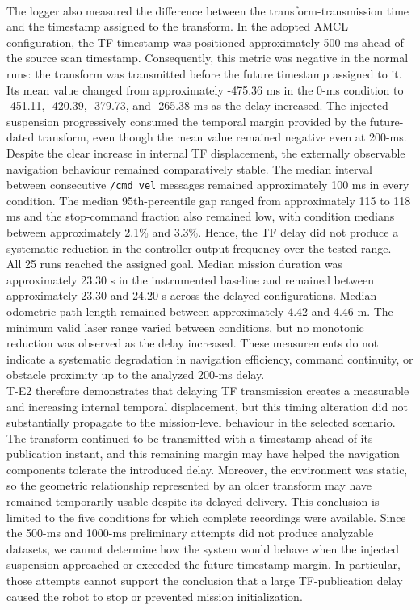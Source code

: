 \\
The logger also measured the difference between the transform-transmission time and the timestamp assigned to the transform. In the adopted AMCL configuration, the TF timestamp was positioned approximately 500 ms ahead of the source scan timestamp. Consequently, this metric was negative in the normal runs: the transform was transmitted before the future timestamp assigned to it. Its mean value changed from approximately -475.36 ms in the 0-ms condition to -451.11, -420.39, -379.73, and -265.38 ms as the delay increased. The injected suspension progressively consumed the temporal margin provided by the future-dated transform, even though the mean value remained negative even at 200-ms.
\\
Despite the clear increase in internal TF displacement, the externally observable navigation behaviour remained comparatively stable. The median interval between consecutive \texttt{/cmd\_vel} messages remained approximately 100 ms in every condition. The median 95th-percentile gap ranged from approximately 115 to 118 ms and the stop-command fraction also remained low, with condition medians between approximately 2.1\% and 3.3\%. Hence, the TF delay did not produce a systematic reduction in the controller-output frequency over the tested range.
\\
All 25 runs reached the assigned goal. Median mission duration was approximately 23.30 s in the instrumented baseline and remained between approximately 23.30 and 24.20 s across the delayed configurations. Median odometric path length remained between approximately 4.42 and 4.46 m. The minimum valid laser range varied between conditions, but no monotonic reduction was observed as the delay increased. These measurements do not indicate a systematic degradation in navigation efficiency, command continuity, or obstacle proximity up to the analyzed 200-ms delay.
\\
T-E2 therefore demonstrates that delaying TF transmission creates a measurable and increasing internal temporal displacement, but this timing alteration did not substantially propagate to the mission-level behaviour in the selected scenario. The transform continued to be transmitted with a timestamp ahead of its publication instant, and this remaining margin may have helped the navigation components tolerate the introduced delay. Moreover, the environment was static, so the geometric relationship represented by an older transform may have remained temporarily usable despite its delayed delivery.
This conclusion is limited to the five conditions for which complete recordings were available. Since the 500-ms and 1000-ms preliminary attempts did not produce analyzable datasets, we cannot determine how the system would behave when the injected suspension approached or exceeded the future-timestamp margin. In particular, those attempts cannot support the conclusion that a large TF-publication delay caused the robot to stop or prevented mission initialization.

